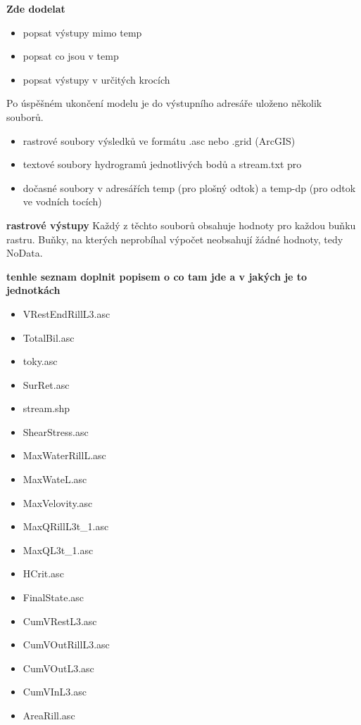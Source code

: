 \textbf{Zde dodelat}
\begin{itemize}
\item popsat výstupy mimo temp
\item popsat co jsou v temp
\item popsat výstupy v určitých krocích
\end{itemize}



Po úspěšném ukončení modelu je do výstupního adresáře uloženo několik souborů.
\begin{itemize}
\item rastrové soubory výsledků ve formátu .asc nebo .grid (ArcGIS)
\item textové soubory hydrogramů jednotlivých bodů a stream.txt pro  
\item dočasné soubory v adresářích temp (pro plošný odtok) a temp-dp (pro odtok ve vodních tocích)
\end{itemize}

\textbf{rastrové výstupy}
Každý z těchto souborů obsahuje hodnoty pro každou buňku rastru. Buňky, na kterých neprobíhal výpočet neobsahují žádné hodnoty, tedy NoData. 

\textbf{tenhle seznam doplnit popisem o co tam jde a v jakých je to jednotkách}
\begin{itemize}
\item VRestEndRillL3.asc
\item TotalBil.asc
\item toky.asc
\item SurRet.asc
\item stream.shp
\item ShearStress.asc
\item MaxWaterRillL.asc
\item MaxWateL.asc
\item MaxVelovity.asc
\item MaxQRillL3t_1.asc
\item MaxQL3t_1.asc
\item HCrit.asc
\item FinalState.asc
\item CumVRestL3.asc
\item CumVOutRillL3.asc
\item CumVOutL3.asc
\item CumVInL3.asc
\item AreaRill.asc
\end{itemize}



